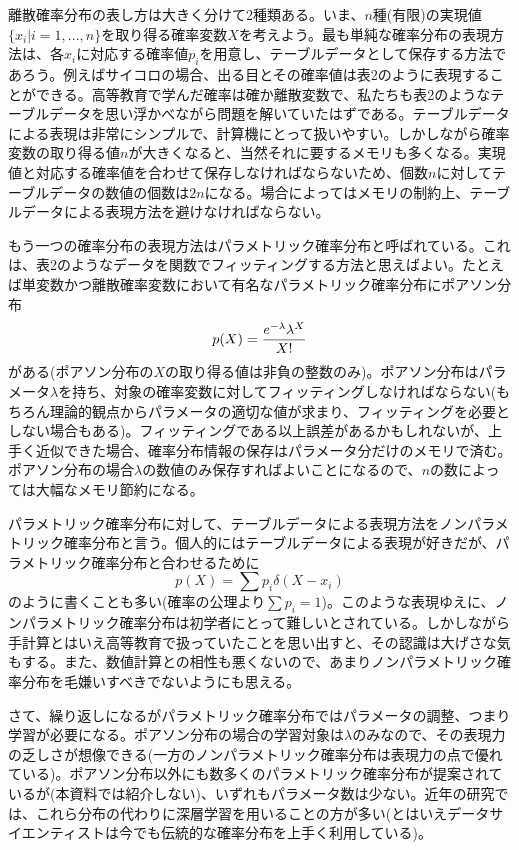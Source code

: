 \documentclass[dvipdfmx, 9pt, a4paper]{jsarticle}
\begin{document}
離散確率分布の表し方は大きく分けて2種類ある。いま、$n$種(有限)の実現値$\{ x_i|i=1,...,n \}$を取り得る確率変数$X$を考えよう。最も単純な確率分布の表現方法は、各$x_i$に対応する確率値$p_i$を用意し、テーブルデータとして保存する方法であろう。例えばサイコロの場合、出る目とその確率値は表2のように表現することができる。高等教育で学んだ確率は確か離散変数で、私たちも表2のようなテーブルデータを思い浮かべながら問題を解いていたはずである。テーブルデータによる表現は非常にシンプルで、計算機にとって扱いやすい。しかしながら確率変数の取り得る値$n$が大きくなると、当然それに要するメモリも多くなる。実現値と対応する確率値を合わせて保存しなければならないため、個数$n$に対してテーブルデータの数値の個数は$2n$になる。場合によってはメモリの制約上、テーブルデータによる表現方法を避けなければならない。\par
もう一つの確率分布の表現方法はパラメトリック確率分布と呼ばれている。これは、表2のようなデータを関数でフィッティングする方法と思えばよい。たとえば単変数かつ離散確率変数において有名なパラメトリック確率分布にポアソン分布
\begin{equation}
p(X)=\frac{e^{-\lambda}\lambda^X}{X!} \notag
\end{equation}
がある(ポアソン分布の$X$の取り得る値は非負の整数のみ)。ポアソン分布はパラメータ$\lambda$を持ち、対象の確率変数に対してフィッティングしなければならない(もちろん理論的観点からパラメータの適切な値が求まり、フィッティングを必要としない場合もある)。フィッティングである以上誤差があるかもしれないが、上手く近似できた場合、確率分布情報の保存はパラメータ分だけのメモリで済む。ポアソン分布の場合$\lambda$の数値のみ保存すればよいことになるので、$n$の数によっては大幅なメモリ節約になる。\par
パラメトリック確率分布に対して、テーブルデータによる表現方法をノンパラメトリック確率分布と言う。個人的にはテーブルデータによる表現が好きだが、パラメトリック確率分布と合わせるために
\begin{equation}
p(X)=\sum p_i \delta(X-x_i)
\end{equation}
のように書くことも多い(確率の公理より$\sum p_i=1$)。このような表現ゆえに、ノンパラメトリック確率分布は初学者にとって難しいとされている。しかしながら手計算とはいえ高等教育で扱っていたことを思い出すと、その認識は大げさな気もする。また、数値計算との相性も悪くないので、あまりノンパラメトリック確率分布を毛嫌いすべきでないようにも思える。\par
さて、繰り返しになるがパラメトリック確率分布ではパラメータの調整、つまり学習が必要になる。ポアソン分布の場合の学習対象は$\lambda$のみなので、その表現力の乏しさが想像できる(一方のノンパラメトリック確率分布は表現力の点で優れている)。ポアソン分布以外にも数多くのパラメトリック確率分布が提案されているが(本資料では紹介しない)、いずれもパラメータ数は少ない。近年の研究では、これら分布の代わりに深層学習を用いることの方が多い(とはいえデータサイエンティストは今でも伝統的な確率分布を上手く利用している)。
\end{document}
